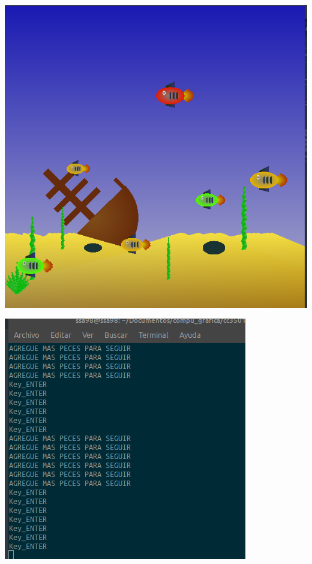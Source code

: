 \documentclass[letterpaper,11pt]{article}
\begin{document}
\begin{minipage}[h]{\textwidth}
  \centering
  \includegraphics[scale=0.3]{images/tarea1/enter.png}
  \label{fig: pez1}
\end{minipage}

\begin{minipage}[h]{\textwidth}
  \centering
  \includegraphics[scale=0.3]{images/tarea1/enter_comando.png}
  \label{fig: pez2}
\end{minipage}
\end{document}
